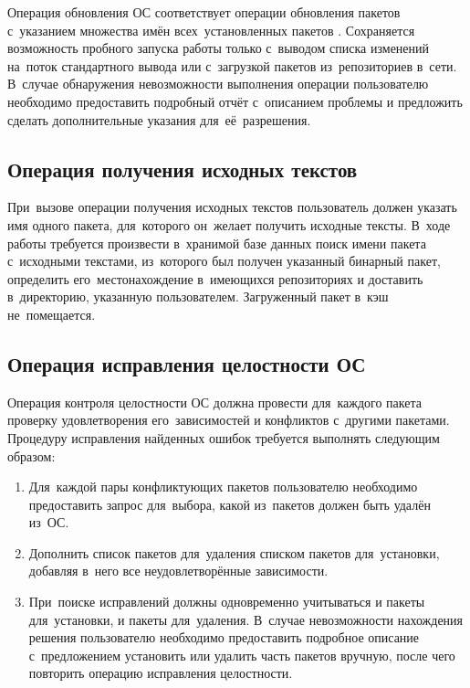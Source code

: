 Операция обновления ОС соответствует операции обновления пакетов с~указанием множества имён всех~установленных пакетов .
Сохраняется возможность пробного запуска работы только с~выводом списка изменений на~поток стандартного вывода или с~загрузкой пакетов из~репозиториев в~сети.
В~случае обнаружения невозможности выполнения операции пользователю необходимо предоставить подробный отчёт с~описанием проблемы и предложить сделать дополнительные указания для~её~разрешения.

\subsection{Операция получения исходных текстов}

При~вызове операции получения исходных текстов пользователь должен указать имя одного пакета,
для~которого он~желает получить исходные тексты.
В~ходе работы требуется произвести в~хранимой базе данных   поиск имени пакета с~исходными текстами,
из~которого был получен указанный бинарный пакет, 
определить его~местонахождение в~имеющихся репозиториях и доставить в~директорию, указанную пользователем.
Загруженный пакет в~кэш не~помещается.

\subsection{Операция исправления целостности ОС}

Операция контроля целостности ОС должна провести для~каждого пакета  проверку удовлетворения его~зависимостей и конфликтов с~другими пакетами.
Процедуру исправления найденных ошибок требуется выполнять следующим образом:

\begin{enumerate}

\item {
Для~каждой пары конфликтующих пакетов пользователю необходимо предоставить запрос для~выбора, 
какой из~пакетов должен быть удалён из~ОС.
}

\item {
Дополнить список пакетов для~удаления списком пакетов для~установки,
добавляя в~него все неудовлетворённые зависимости.
}

\item {
При~поиске исправлений должны одновременно учитываться и пакеты для~установки, и пакеты для~удаления.
В~случае невозможности нахождения решения пользователю необходимо предоставить подробное описание с~предложением установить или удалить часть пакетов вручную,
после чего повторить операцию исправления целостности.
}

\end{enumerate}

